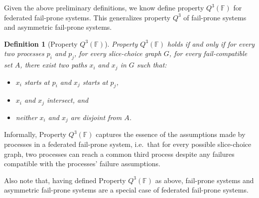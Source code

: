 \documentclass[11pt]{article}
\newtheorem{definition}{Definition}
\begin{document}
Given the above preliminary definitions, we know define property $Q^3(\mathbb{F})$ for federated fail-prone systems. This generalizes property $Q^3$ of fail-prone systems and asymmetric fail-prone systems.

\begin{definition}[Property $Q^3(\mathbb{F})$]
  Property $Q^3(\mathbb{F})$ holds if and only if for every two processes $p_i$ and $p_j$, for every slice-choice graph $G$, for every fail-compatible set $A$, there exist two paths $x_i$ and $x_j$ in $G$ such that:
  \begin{itemize}
    \item $x_i$ starts at $p_i$ and $x_j$ starts at $p_j$,
    \item $x_i$ and $x_j$ intersect, and
    \item neither $x_i$ and $x_j$ are disjoint from $A$.
  \end{itemize}
\end{definition}

Informally, Property $Q^3(\mathbb{F})$ captures the essence of the assumptions made by processes in a federated fail-prone system, i.e.\ that for every possible slice-choice graph, two processes can reach a common third process despite any failures compatible with the processes' failure assumptions.

Also note that, having defined Property $Q^3(\mathbb{F})$ as above, fail-prone systems and asymmetric fail-prone systems are a special case of federated fail-prone systems.
\end{document}
